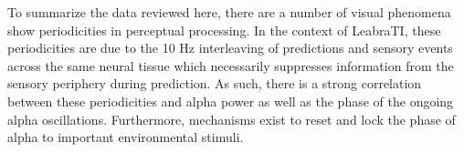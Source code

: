 \documentclass[dwyatte_dissertation.tex]{subfiles}
\begin{document}
To summarize the data reviewed here, there are a number of visual phenomena show periodicities in perceptual processing. In the context of LeabraTI, these periodicities are due to the 10 Hz interleaving of predictions and sensory events across the same neural tissue which necessarily suppresses information from the sensory periphery during prediction. As such, there is a strong correlation between these periodicities and alpha power as well as the phase of the ongoing alpha oscillations. Furthermore, mechanisms exist to reset and lock the phase of alpha to important environmental stimuli. 

%
%
\end{document}
